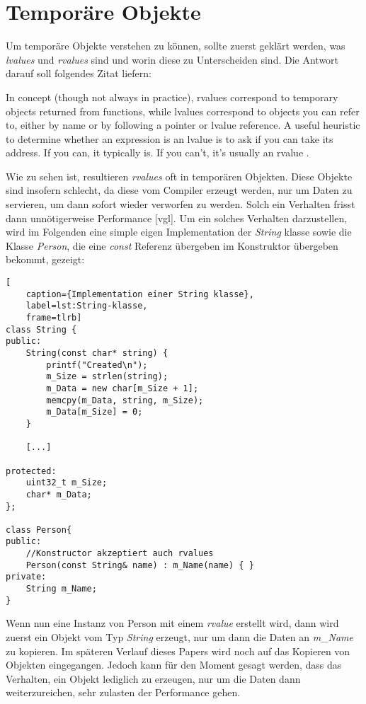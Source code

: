 \section{Temporäre Objekte}\label{sec:tempobj}
Um temporäre Objekte verstehen zu können, sollte zuerst geklärt werden, was \emph{lvalues} und
\emph{rvalues} sind und worin diese zu Unterscheiden sind. Die Antwort darauf soll folgendes
Zitat liefern:
\begin{zitat}
    In concept (though not always in practice), rvalues correspond to temporary
    objects returned from functions, while lvalues correspond to objects you can refer to, either by
    name or by following a pointer or lvalue reference. A useful heuristic to determine whether an
    expression is an lvalue is to ask if you can take its address. If you can, it typically is. If
    you can’t, it’s usually an rvalue \cite{EffectiveC++}.
\end{zitat}
Wie zu sehen ist, resultieren \emph{rvalues} oft in temporären Objekten. Diese Objekte sind
insofern schlecht, da diese vom Compiler erzeugt werden, nur um Daten zu servieren, um dann sofort
wieder verworfen zu werden. Solch ein Verhalten frisst dann unnötigerweise Performance
\cite{HandsOn}[vgl].
\newline
\newline
Um ein solches Verhalten darzustellen, wird im Folgenden eine simple eigen Implementation der
\emph{String} klasse sowie die Klasse \emph{Person}, die eine \emph{const} Referenz übergeben im
Konstruktor übergeben bekommt, gezeigt:

\begin{lstlisting}[
    caption={Implementation einer String klasse},
    label=lst:String-klasse,
    frame=tlrb]
class String {
public:
	String(const char* string) {
		printf("Created\n");
		m_Size = strlen(string);
		m_Data = new char[m_Size + 1];
		memcpy(m_Data, string, m_Size);
		m_Data[m_Size] = 0;
	}

	[...]

protected:
    uint32_t m_Size;
    char* m_Data;
};

class Person{
public:
	//Konstructor akzeptiert auch rvalues
	Person(const String& name) : m_Name(name) { }
private:
	String m_Name;
}
\end{lstlisting}

Wenn nun eine Instanz von Person mit einem \emph{rvalue} erstellt wird, dann wird zuerst ein
Objekt vom Typ \emph{String} erzeugt, nur um dann die Daten an \emph{m\_Name} zu kopieren. Im
späteren Verlauf dieses Papers wird noch auf das Kopieren von Objekten eingegangen. Jedoch kann
für den Moment gesagt werden, dass das Verhalten, ein Objekt lediglich zu erzeugen, nur um die
Daten dann weiterzureichen, sehr zulasten der Performance gehen.